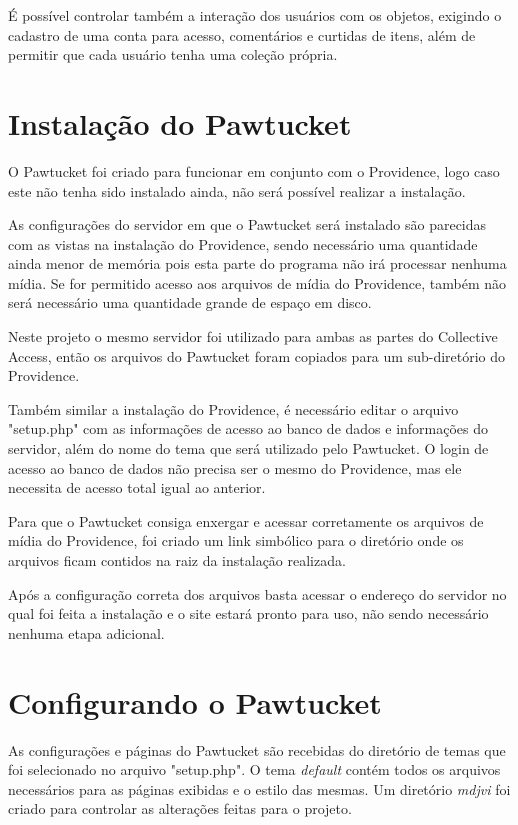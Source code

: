 \documentclass[a4paper,12pt,oneside,onecolumn,final,fleqn]{repUERJ}
\begin{document}
É possível controlar também a interação dos usuários com os objetos, exigindo o cadastro de uma conta para acesso, comentários e curtidas de itens, além de permitir que cada usuário tenha uma coleção própria.

\section{Instalação do Pawtucket}

O Pawtucket foi criado para funcionar em conjunto com o Providence, logo caso este não tenha sido instalado ainda, não será possível realizar a instalação.

As configurações do servidor em que o Pawtucket será instalado são parecidas com as vistas na instalação do Providence, sendo necessário uma quantidade ainda menor de memória pois esta parte do programa não irá processar nenhuma mídia. Se for permitido acesso aos arquivos de mídia do Providence, também não será necessário uma quantidade grande de espaço em disco.

Neste projeto o mesmo servidor foi utilizado para ambas as partes do Collective Access, então os arquivos do Pawtucket foram copiados para um sub-diretório do Providence.

Também similar a instalação do Providence, é necessário editar o arquivo "setup.php" com as informações de acesso ao banco de dados e informações do servidor, além do nome do tema que será utilizado pelo Pawtucket. O login de acesso ao banco de dados não precisa ser o mesmo do Providence, mas ele necessita de acesso total igual ao anterior.

Para que o Pawtucket consiga enxergar e acessar corretamente os arquivos de mídia do Providence, foi criado um link simbólico para o diretório onde os arquivos ficam contidos na raiz da instalação realizada.

Após a configuração correta dos arquivos basta acessar o endereço do servidor no qual foi feita a instalação e o site estará pronto para uso, não sendo necessário nenhuma etapa adicional.

\section{Configurando o Pawtucket}

As configurações e páginas do Pawtucket são recebidas do diretório de temas que foi selecionado no arquivo "setup.php". O tema \textit{default} contém todos os arquivos necessários para as páginas exibidas e o estilo das mesmas. Um diretório \textit{mdjvi} foi criado para controlar as alterações feitas para o projeto.
\end{document}
